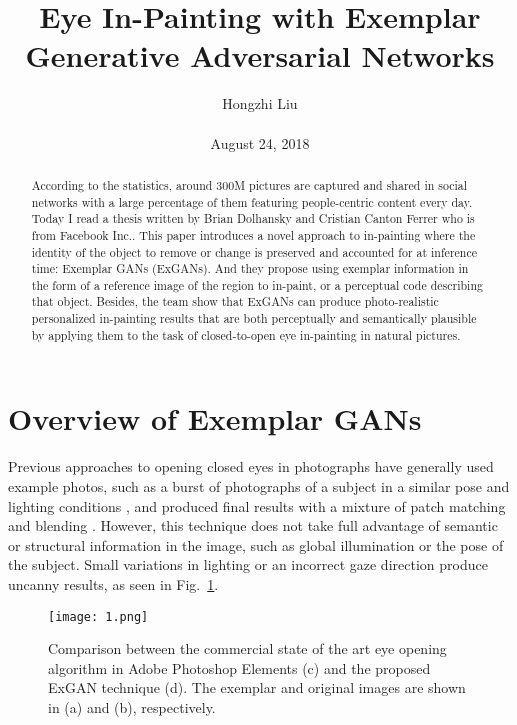 \documentclass[10pt,twocolumn,letterpaper]{article}
\title{Eye In-Painting with Exemplar Generative Adversarial Networks}
\author{Hongzhi Liu\\\\
August 24, 2018}
\begin{document}
\maketitle
\begin{abstract}
	According to the statistics, around 300M pictures are captured and shared in social networks with a large percentage of them featuring people-centric content every day. Today I read a thesis written by Brian Dolhansky and Cristian Canton Ferrer who is from Facebook Inc.. This paper introduces a novel approach to in-painting where the identity of the object to remove or change is preserved and accounted for at inference time: Exemplar GANs (ExGANs). And they propose using exemplar information in the form of a reference image of the region to in-paint, or a perceptual code describing that object. Besides, the team show that ExGANs can produce photo-realistic personalized in-painting results that are both perceptually and semantically plausible by applying them to the task of closed-to-open eye in-painting in natural pictures.
\end{abstract}

\section{Overview of Exemplar GANs}

Previous approaches to opening closed eyes in photographs have generally used example photos, such as a burst of photographs of a subject in a similar pose and lighting conditions \cite{Agarwala2004Interactive}, and produced final results with a mixture of patch matching \cite{Barnes2009PatchMatch} and blending \cite{Rez2003Poisson}. However, this technique does not take full advantage of semantic or structural information in the image, such as global illumination or the pose of the subject. Small variations in lighting or an incorrect gaze direction produce uncanny results, as seen in Fig.~\ref{p1}.
\begin{figure}
	\begin{center}
		\texttt{[image: 1.png]}
	\end{center}
	\caption{Comparison between the commercial state of the	art eye opening algorithm in Adobe Photoshop Elements (c) and the proposed ExGAN technique (d). The exemplar	and original images are shown in (a) and (b), respectively.}
	\label{p1}
\end{figure}
\end{document}
